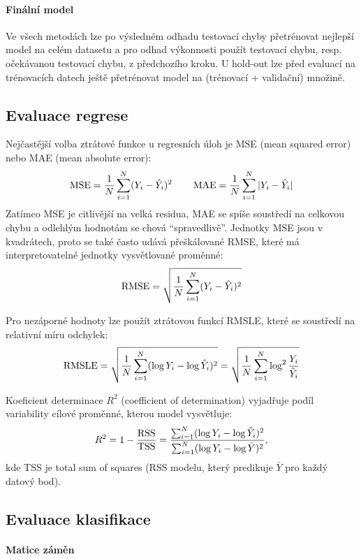 \documentclass[../main.tex]{subfiles}
\begin{document}
\paragraph{Finální model} Ve všech metodách lze po výsledném odhadu testovací chyby přetrénovat nejlepší model na celém datasetu a pro odhad výkonnosti použít testovací chybu, resp. očekávanou testovací chybu, z předchozího kroku. U hold-out lze před evaluací na trénovacích datech ještě přetrénovat model na (trénovací + validační) množině.

\subsection{Evaluace regrese}

Nejčastější volba ztrátové funkce u regresních úloh je MSE (mean squared error) nebo MAE (mean absolute error):
\[
    \operatorname{MSE} = \frac{1}{N} \sum_{i=1}^{N} (Y_i - \hat{Y}_i)^2
    \qquad
    \operatorname{MAE} = \frac{1}{N} \sum_{i=1}^{N} |Y_i - \hat{Y}_i|
\]
Zatímco MSE je citlivější na velká residua, MAE se spíše soustředí na celkovou chybu a odlehlým hodnotám se chová ``spravedlivě''. Jednotky MSE jsou v kvadrátech, proto se také často udává přeškálované RMSE, které má interpretovatelné jednotky vysvětlované proměnné:
\[
    \operatorname{RMSE} = \sqrt{\frac{1}{N} \sum_{i=1}^{N} (Y_i - \hat{Y}_i)^2}
\]

Pro nezáporné hodnoty lze použít ztrátovou funkcí RMSLE, které se soustředí na relativní míru odchylek:
\[
    \operatorname{RMSLE} = \sqrt{\frac{1}{N} \sum_{i=1}^{N} (\log Y_i - \log \hat{Y}_i)^2}
    = \sqrt{\frac{1}{N} \sum_{i=1}^{N} \log^2 \frac{Y_i}{\hat{Y}_i}}
\]

Koeficient determinace $R^2$ (coefficient of determination) vyjadřuje podíl variability cílové proměnné, kterou model vysvětluje:
\[
    R^2 = 1 - \frac{\operatorname{RSS}}{\operatorname{TSS}}
    = \frac{
        \sum_{i=1}^{N} (\log Y_i - \log \hat{Y}_i)^2
    }{
        \sum_{i=1}^{N} (\log Y_i - \log \bar{Y})^2
    },
\]
kde TSS je total sum of squares (RSS modelu, který predikuje $\bar{Y}$ pro každý datový bod).

\subsection{Evaluace klasifikace}

\paragraph{Matice záměn}
\end{document}
